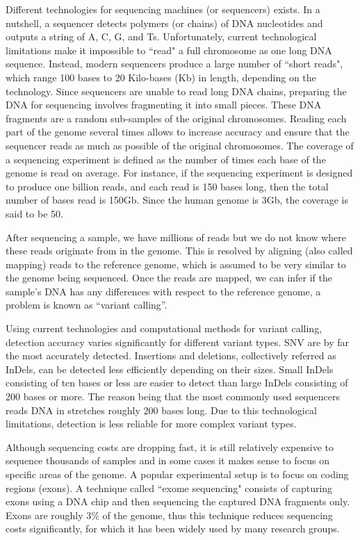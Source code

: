Different technologies for sequencing machines (or sequencers) exists. In a nutshell, a sequencer detects polymers (or chains) of DNA nucleotides and outputs a string of A, C, G, and Ts. Unfortunately, current technological limitations make it impossible to ``read" a full chromosome as one long DNA sequence. Instead, modern sequencers produce a large number of ``short reads", which range 100 bases to 20 Kilo-bases (Kb) in length, depending on the technology. Since sequencers are unable to read long DNA chains, preparing the DNA for sequencing involves fragmenting it into small pieces. These DNA fragments are a random sub-samples of the original chromosomes. Reading each part of the genome several times allows to increase accuracy and ensure that the sequencer reads as much as possible of the original chromosomes. The coverage of a sequencing experiment is defined as the number of times each base of the genome is read on average. For instance, if the sequencing experiment is designed to produce one billion reads, and each read is 150 bases long, then the total number of bases read is 150Gb. Since the human genome is 3Gb, the coverage is said to be 50.

After sequencing a sample, we have millions of reads but we do not know where these reads originate from in the genome. This is resolved by aligning (also called mapping) reads to the reference genome, which is assumed to be very similar to the genome being sequenced. Once the reads are mapped, we can infer if the sample’s DNA has any differences with respect to the reference genome, a problem is known as ``variant calling''. 

Using current technologies and computational methods for variant calling, detection accuracy varies significantly for different variant types. SNV are by far the most accurately detected. Insertions and deletions, collectively referred as InDels, can be detected less efficiently depending on their sizes. Small InDels consisting of ten bases or less are easier to detect than large InDels consisting of 200 bases or more. The reason being that the most commonly used sequencers reads DNA in stretches roughly 200 bases long. Due to this technological limitations, detection is less reliable for more complex variant types.

Although sequencing costs are dropping fast, it is still relatively expensive to sequence thousands of samples and in some cases it makes sense to focus on specific areas of the genome. A popular experimental setup is to focus on coding regions (exons). A technique called ``exome sequencing" consists of capturing exons using a DNA chip and then sequencing the captured DNA fragments only. Exons are roughly 3\% of the genome, thus this technique reduces sequencing costs significantly, for which it has been widely used by many research groups.

